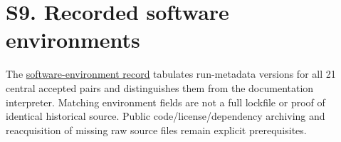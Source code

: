 \documentclass[11pt,a4paper]{article}
\begin{document}
\section*{S9. Recorded software environments}
The \href{software_environment.md}{software-environment record} tabulates run-metadata versions for all 21 central accepted pairs and distinguishes them from the documentation interpreter. Matching environment fields are not a full lockfile or proof of identical historical source. Public code/license/dependency archiving and reacquisition of missing raw source files remain explicit prerequisites.
\end{document}
